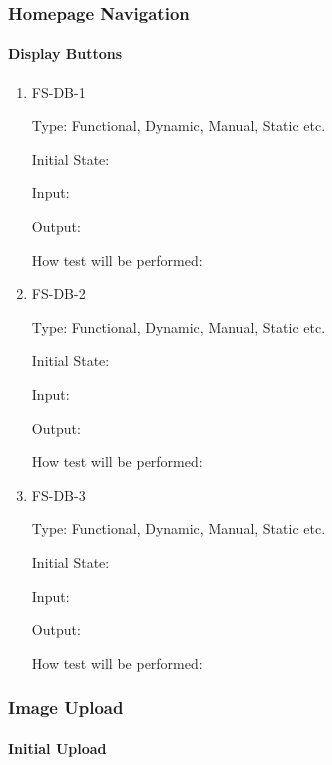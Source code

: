 \documentclass[11pt]{article}
\begin{document}
\subsubsection{Homepage Navigation}
		
\paragraph{Display Buttons}

\begin{enumerate}

\item{FS-DB-1\\}

Type: Functional, Dynamic, Manual, Static etc.
					
Initial State: 
					
Input: 
					
Output: 
					
How test will be performed: 
					
\item{FS-DB-2\\}

Type: Functional, Dynamic, Manual, Static etc.
					
Initial State: 
					
Input: 
					
Output: 
					
How test will be performed: 

\item{FS-DB-3\\}

Type: Functional, Dynamic, Manual, Static etc.
					
Initial State: 
					
Input: 
					
Output: 
					
How test will be performed: 

\end{enumerate}

\subsubsection{Image Upload}

\paragraph{Initial Upload}
\end{document}
